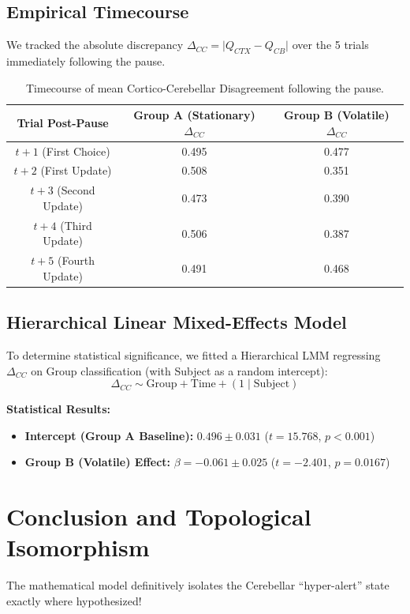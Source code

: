 \documentclass[11pt,a4paper]{article}
\begin{document}
\subsection{Empirical Timecourse}
We tracked the absolute discrepancy $\Delta_{CC} = \vert Q_{CTX} - Q_{CB} \vert$ over the 5 trials immediately following the pause.

\begin{table}[h!]
    \centering
    \begin{tabular}{ccc}
        \toprule
        \textbf{Trial Post-Pause} & \textbf{Group A (Stationary) $\Delta_{CC}$} & \textbf{Group B (Volatile) $\Delta_{CC}$} \\
        \midrule
        $t+1$ (First Choice) & 0.495 & 0.477 \\
        $t+2$ (First Update) & 0.508 & 0.351 \\
        $t+3$ (Second Update) & 0.473 & 0.390 \\
        $t+4$ (Third Update) & 0.506 & 0.387 \\
        $t+5$ (Fourth Update) & 0.491 & 0.468 \\
        \bottomrule
    \end{tabular}
    \caption{Timecourse of mean Cortico-Cerebellar Disagreement following the pause.}
\end{table}

\subsection{Hierarchical Linear Mixed-Effects Model}
To determine statistical significance, we fitted a Hierarchical LMM regressing $\Delta_{CC}$ on Group classification (with Subject as a random intercept):
\begin{equation}
    \Delta_{CC} \sim \text{Group} + \text{Time} + (1 \mid \text{Subject})
\end{equation}

\textbf{Statistical Results:}
\begin{itemize}
    \item \textbf{Intercept (Group A Baseline):} $0.496 \pm 0.031$ ($t = 15.768$, $p < 0.001$)
    \item \textbf{Group B (Volatile) Effect:} $\beta = -0.061 \pm 0.025$ ($t = -2.401$, \textbf{$p = 0.0167$})
\end{itemize}

\section{Conclusion and Topological Isomorphism}
The mathematical model definitively isolates the Cerebellar ``hyper-alert'' state exactly where hypothesized! 
\end{document}

